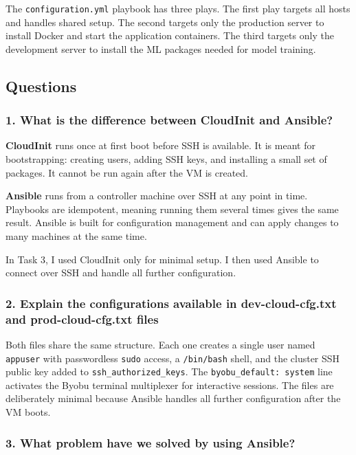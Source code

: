 \documentclass[11pt,a4paper]{article}
\begin{document}
The \texttt{configuration.yml} playbook has three plays. The first play targets
all hosts and handles shared setup. The second targets only the production server
to install Docker and start the application containers. The third targets only
the development server to install the ML packages needed for model training.



\subsection{Questions}

\subsubsection*{1. What is the difference between CloudInit and Ansible?}

\textbf{CloudInit} runs once at first boot before SSH is available. It is meant
for bootstrapping: creating users, adding SSH keys, and installing a small set of
packages. It cannot be run again after the VM is created.

\textbf{Ansible} runs from a controller machine over SSH at any point in time.
Playbooks are idempotent, meaning running them several times gives the same result.
Ansible is built for configuration management and can apply changes to many machines
at the same time.

In Task 3, I used CloudInit only for minimal setup. I then used Ansible to connect over SSH and
handle all further configuration.

\subsubsection*{2. Explain the configurations available in dev-cloud-cfg.txt and prod-cloud-cfg.txt files}

Both files share the same structure. Each one creates a single user named
\texttt{appuser} with passwordless \texttt{sudo} access, a \texttt{/bin/bash}
shell, and the cluster SSH public key added to
\texttt{ssh\_authorized\_keys}.
The \texttt{byobu\_default: system} line activates the Byobu terminal
multiplexer for interactive sessions. The files are deliberately minimal
because Ansible handles all further configuration after the VM boots.

\subsubsection*{3. What problem have we solved by using Ansible?}
\end{document}
